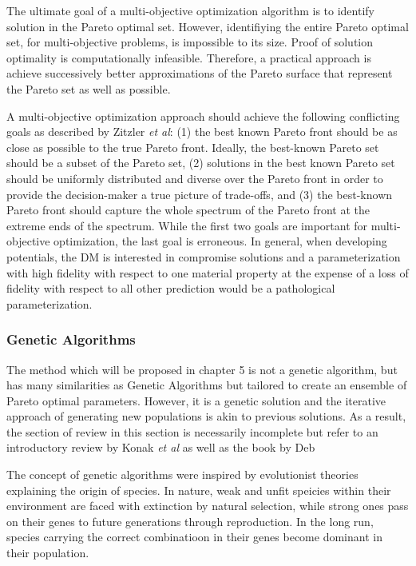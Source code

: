 The ultimate goal of a multi-objective optimization algorithm is to identify solution in the Pareto optimal set.  However, identifiying the entire Pareto optimal set, for multi-objective problems, is impossible to its size.  Proof of solution optimality is computationally infeasible.  Therefore, a practical approach is achieve successively better approximations of the Pareto surface that represent the Pareto set as well as possible.

A multi-objective optimization approach should achieve the following conflicting goals as described by Zitzler \emph{et al}\cite{zitzler2000_moo_evolve}: (1) the best known Pareto front should be as close as possible to the true Pareto front.  Ideally, the best-known Pareto set should be a subset of the Pareto set, (2) solutions in the best known Pareto set should be uniformly distributed and diverse over the Pareto front in order to provide the decision-maker a true picture of trade-offs, and (3) the best-known Pareto front should capture the whole spectrum of the Pareto front at the extreme ends of the spectrum.  While the first two goals are important for multi-objective optimization, the last goal is erroneous.  In general, when developing potentials, the DM is interested in compromise solutions and a parameterization with high fidelity with respect to one material property at the expense of a loss of fidelity with respect to all other prediction would be a pathological parameterization.

\subsubsection{Genetic Algorithms}
The method which will be proposed in chapter 5 is not a genetic algorithm, but has many similarities as Genetic Algorithms but tailored to create an ensemble of Pareto optimal parameters.  However, it is a genetic solution and the iterative approach of generating new populations is akin to previous solutions.  As a result, the section of review in this section is necessarily incomplete but refer to an introductory review by Konak \emph{et al}\cite{Konak2006_moo_ga} as well as the book by Deb\cite{deb2001_moo_ga}

The concept of genetic algorithms were inspired by evolutionist theories explaining the origin of species\cite{holland1992_ga}.  In nature, weak and unfit speicies within their environment are faced with extinction by natural selection, while strong ones pass on their genes to future generations through reproduction.  In the long run, species carrying the correct combinatioon in their
    genes become dominant in their population.

